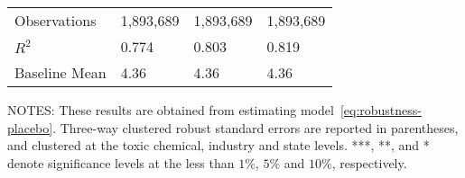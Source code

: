 \begin{table}[H]
{\begin{tabular}{@{}llll@{}}
            Observations                                             & 1,893,689 & 1,893,689 & 1,893,689 \\
            $R^2$                                                    & 0.774     & 0.803     & 0.819     \\
            Baseline Mean                                            & 4.36      & 4.36      & 4.36      \\ \bottomrule \bottomrule
        \end{tabular}%
    }
    \begin{minipage}{\columnwidth}
        \vspace{0.05in}
        \tiny NOTES: These results are obtained from estimating model~\ref{eq:robustness-placebo}. Three-way clustered robust standard errors are reported in parentheses, and clustered at the toxic chemical, industry and state levels. ***, **, and * denote significance levels at the less than $1\%$, $5\%$ and $10\%$, respectively.
    \end{minipage}
\end{table}